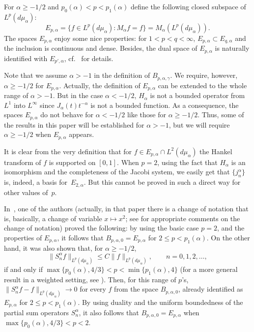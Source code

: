 \documentclass[a4paper]{amsart}
\newcommand{\mua}{d\mu_\alpha}
\begin{document}
For $\alpha \ge -1/2$ and $p_0(\alpha) < p < p_1(\alpha)$ define the
following closed subspace of~$L^p(\mua)$:
\begin{equation}
\label{eq:Epa}
  E_{p,\alpha} = \{ f \in L^p(\mua): M_\alpha f = f\}
  = M_\alpha(L^p(\mua)).
\end{equation}
The spaces $E_{p,\alpha}$ enjoy some nice properties: for $1<p<q<\infty$,
$E_{p,\alpha} \subset E_{q,\alpha}$ and the inclusion is continuous and dense.
Besides, the dual space of $E_{p,\alpha}$ is naturally identified
with $E_{p',\alpha}$, cf.~\cite{V} for details.

Note that we assume $\alpha>-1$ in the definition of $B_{p,\alpha,\gamma}$.
 We require, however, $\alpha\ge-1/2$ for $E_{p,\alpha}$. Actually, the
definition of $E_{p,\alpha}$ can be extended to the whole range of $\alpha >
-1$. But in the case $\alpha < -1/2$, $H_{\alpha}$ is not a bounded operator
from $L^1$ into $L^\infty$ since $J_\alpha(t)t^{-\alpha}$ is not a bounded function.
As a consequence, the spaces
$E_{p,\alpha}$ do not behave for $\alpha<-1/2$ like those for $\alpha\ge-1/2$.
Thus, some of the results in this paper will be established for $\alpha>-1$,
but we will require $\alpha\ge-1/2$ when $E_{p,\alpha}$ appears.

It is clear from the very definition that for $f \in E_{p,\alpha}
\cap L^2(\mua)$ the Hankel
transform of $f$ is supported on $[0,1]$. When $p=2$, using the fact that
$H_{\alpha}$ is an isomorphism
and the completeness of the Jacobi system, we easily get that
$\{j_n^\alpha\}$ is, indeed, a basis for~$E_{2,\alpha}$.
But this cannot be proved in such a direct way for other values of~$p$.

In~\cite{V}, one of the authors
(actually, in that paper there is a change of notation that is, basically,
a change of variable $x \mapsto x^2$; see \cite[Remark~1]{CiV} for
appropriate comments on the change of notation) proved the following:
by using the basic case $p=2$, and the properties
of $E_{p,\alpha}$, it follows that $B_{p,\alpha,0} = E_{p,\alpha}$
for $2 \le p < p_1(\alpha)$.
On the other hand, it was also shown that, for $\alpha\ge-1/2$,
\begin{equation*}
  \|S_n^\alpha f\|_{L^p(\mua)} \le C \|f\|_{L^p(\mua)},\qquad n=0,1,2,\dots,
\end{equation*}
if and only if $\max\{p_0(\alpha),4/3\} < p < \min\{p_1(\alpha),4\}$
(for a more general result in a weighted setting, see \cite[Theorem~1]{CiGPV}).
Then, for this range of $p$'s, $\|S_n^\alpha f-f\|_{L^p(\mua)} \to 0$
for every $f$ from the space $B_{p,\alpha,0}$, already identified
as $E_{p,\alpha}$ for $2 \le p < p_1(\alpha)$.
By using duality and the uniform boundedness of the partial sum operators $S_n^\alpha$,
it  also follows that  $B_{p,\alpha,0} = E_{p,\alpha}$
when $\max\{p_0(\alpha),4/3\} < p < 2$.
\end{document}
